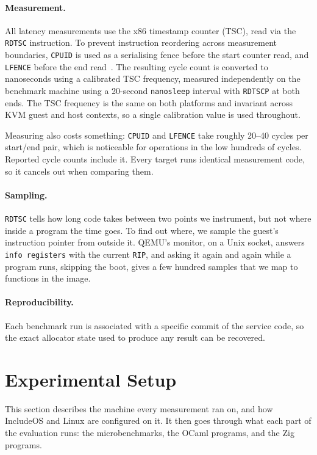 \documentclass[12pt]{report}
\renewcommand{\_}{\origunderscore\allowbreak}
\begin{document}
\paragraph{Measurement.} All latency measurements use the x86 timestamp counter (TSC), read via the \texttt{RDTSC} instruction. To prevent instruction reordering across measurement boundaries, \texttt{CPUID} is used as a serialising fence before the start counter read, and \texttt{LFENCE} before the end read~\cite{paoloni2010rdtsc}. The resulting cycle count is converted to nanoseconds using a calibrated TSC frequency, measured independently on the benchmark machine using a 20-second \texttt{nanosleep} interval with \texttt{RDTSCP} at both ends. The TSC frequency is the same on both platforms and invariant across KVM guest and host contexts, so a single calibration value is used throughout.

Measuring also costs something: \texttt{CPUID} and \texttt{LFENCE} take roughly 20--40 cycles per start/end pair, which is noticeable for operations in the low hundreds of cycles. Reported cycle counts include it. Every target runs identical measurement code, so it cancels out when comparing them.

\paragraph{Sampling.} \texttt{RDTSC} tells how long code takes between two points we instrument, but not where inside a program the time goes. To find out where, we sample the guest's instruction pointer from outside it. QEMU's monitor, on a Unix socket, answers \texttt{info registers} with the current \texttt{RIP}, and asking it again and again while a program runs, skipping the boot, gives a few hundred samples that we map to functions in the image.

\paragraph{Reproducibility.} Each benchmark run is associated with a specific commit of the service code, so the exact allocator state used to produce any result can be recovered.

\section{Experimental Setup}
\label{sec:experimental-setup}

This section describes the machine every measurement ran on, and how IncludeOS and Linux are configured on it. It then goes through what each part of the evaluation runs: the microbenchmarks, the OCaml programs, and the Zig programs.
\end{document}
